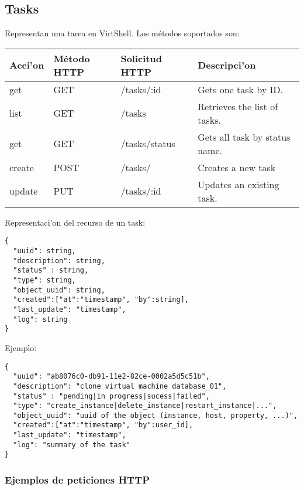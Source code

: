 \subsection{Tasks}
Representan una tarea en VirtShell. Los métodos soportados son:

\begin{center}
 \begin{tabular}{| l | l | l | l |}
 \hline
  \rowcolor{blueapi}
  \textbf{Acci'on} & \textbf{Método HTTP} & \textbf{Solicitud HTTP} & \textbf{Descripci'on} \\ [0.5ex] 
  \hline\hline
  get & GET & /tasks/:id & Gets one task by ID. \\
  \hline
  list & GET & /tasks & Retrieves the list of tasks. \\
  \hline
  get & GET & /tasks/status & Gets all task by status name. \\
  \hline 
  create & POST & /tasks/ & Creates a new task \\
  \hline  
  update & PUT & /tasks/:id & Updates an existing task. \\ [1ex] 
  \hline
\end{tabular}
\end{center}

Representaci'on del recurso de un task:

\medskip
\begin{lstlisting}[style=json]
{
  "uuid": string,
  "description": string,
  "status" : string,
  "type": string,
  "object_uuid": string,
  "created":["at":"timestamp", "by":string],
  "last_update": "timestamp",
  "log": string
}
\end{lstlisting}

Ejemplo:

\medskip
\begin{lstlisting}[style=json]
{
  "uuid": "ab8076c0-db91-11e2-82ce-0002a5d5c51b",
  "description": "clone virtual machine database_01",
  "status" : "pending|in progress|sucess|failed",
  "type": "create_instance|delete_instance|restart_instance|...",
  "object_uuid": "uuid of the object (instance, host, property, ...)",
  "created":["at":"timestamp", "by":user_id],
  "last_update": "timestamp",
  "log": "summary of the task"
}
\end{lstlisting}

\subsubsection{Ejemplos de peticiones HTTP}

